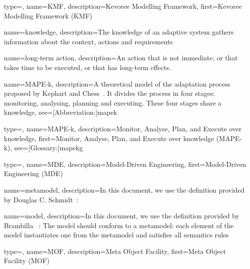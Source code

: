 {
	type=\acronymtype,
	name={KMF},
	description={Kevoree Modelling Framework},
	first={Kevoree Modelling Framework (KMF)}
}

{
	name={knowl\-ed\-ge},
	description={The knowledge of an adaptive system gathers information about the \gls{context}, \glspl{action} and \glspl{requirement}}
}

{
	name={long-term action},
	description={An \gls{action} that is not immediate, or that takes time to be executed, or that has long-term effects.}
}

{
	name={MAPE-k},
    description={A theoretical model of the adaptation process proposed by Kephart and Chess~\cite{DBLP:journals/computer/KephartC03}. It divides the process in four stages: monitoring, analysing, planning and executing. These four stages share a \gls{knowledge}},
    see=[Abbreviation:]{mapek}
}

{
	type=\acronymtype, 
	name={MAPE-k}, 
	description={Monitor, Analyse, Plan, and Execute over knowledge}, 
	first={Monitor, Analyse, Plan, and Execute over knowledge (MAPE-k)}, 
	see=[Glossary:]{mapekg}
}

{
	type=\acronymtype, 
	name={MDE},
	description={Model-Driven Engineering},
	first={Model-Driven Engineering (MDE)}
}

{
	name={meta\-model},
	description={In this document, we use the definition provided by Douglas C. \linebreak Schmidt~\cite{DBLP:journals/computer/Schmidt06}: }
}

{
	name={model},
	description={In this document, we use the definition provided by Brambilla \etal~\cite{DBLP:series/synthesis/2017Brambilla}:  The model should conform to a \gls{metamodel}: each element of the model instantiates one from the \gls{metamodel} and satisfies all semantics rules~\cite{DBLP:conf/iceccs/BezivinJT05}}
}

{
	type=\acronymtype, 
	name={MOF},
	description={Meta Object Facility},
	first={Meta Object Facility (MOF)}
}

